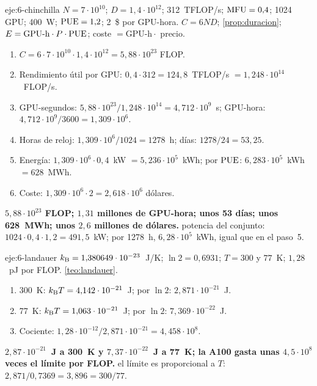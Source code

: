 \begin{solucion}{eje:6-chinchilla}
\datos $N=7\cdot 10^{10}$; $D=1{,}4\cdot 10^{12}$; 312~TFLOP/s; $\mathrm{MFU}=0{,}4$; 1024 GPU; 400~W; $\mathrm{PUE}=1{,}2$; 2~\$ por GPU-hora.
\planteamiento $C=6ND$; \cref{prop:duracion}; $E=\text{GPU-h}\cdot P\cdot\mathrm{PUE}$; coste $=\text{GPU-h}\cdot$ precio.
\pasos
\begin{enumerate}[label=\arabic*.]
  \item $C=6\cdot 7\cdot 10^{10}\cdot 1{,}4\cdot 10^{12}=5{,}88\cdot 10^{23}$ FLOP.
  \item Rendimiento útil por GPU: $0{,}4\cdot 312=124{,}8$~TFLOP/s $=1{,}248\cdot 10^{14}$~FLOP/s.
  \item GPU-segundos: $5{,}88\cdot 10^{23}/1{,}248\cdot 10^{14}=4{,}712\cdot 10^{9}$~s; GPU-hora: $4{,}712\cdot 10^{9}/3600=1{,}309\cdot 10^{6}$.
  \item Horas de reloj: $1{,}309\cdot 10^{6}/1024=1278$~h; días: $1278/24=53{,}25$.
  \item Energía: $1{,}309\cdot 10^{6}\cdot 0{,}4$~kW $=5{,}236\cdot 10^{5}$~kWh; por $\mathrm{PUE}$: $6{,}283\cdot 10^{5}$~kWh $=628$~MWh.
  \item Coste: $1{,}309\cdot 10^{6}\cdot 2=2{,}618\cdot 10^{6}$ dólares.
\end{enumerate}
\resultado \textbf{$5{,}88\cdot 10^{23}$ FLOP; $1{,}31$ millones de GPU-hora; unos 53 días; unos 628~MWh; unos $2{,}6$ millones de dólares.}
\comprobacion potencia del conjunto: $1024\cdot 0{,}4\cdot 1{,}2=491{,}5$~kW; por 1278~h, $6{,}28\cdot 10^{5}$~kWh, igual que en el paso~5.
\end{solucion}

\begin{solucion}{eje:6-landauer}
\datos $k_{\mathrm{B}}=1{,}380649\cdot 10^{-23}$~J/K; $\ln 2=0{,}6931$; $T=300$ y $77$~K; $1{,}28$~pJ por FLOP.
\planteamiento \cref{teo:landauer}.
\pasos
\begin{enumerate}[label=\arabic*.]
  \item 300~K: $k_{\mathrm{B}} T=4{,}142\cdot 10^{-21}$~J; por $\ln 2$: $2{,}871\cdot 10^{-21}$~J.
  \item 77~K: $k_{\mathrm{B}} T=1{,}063\cdot 10^{-21}$~J; por $\ln 2$: $7{,}369\cdot 10^{-22}$~J.
  \item Cociente: $1{,}28\cdot 10^{-12}/2{,}871\cdot 10^{-21}=4{,}458\cdot 10^{8}$.
\end{enumerate}
\resultado \textbf{$2{,}87\cdot 10^{-21}$~J a 300~K y $7{,}37\cdot 10^{-22}$~J a 77~K; la A100 gasta unas $4{,}5\cdot 10^{8}$ veces el límite por FLOP.}
\comprobacion el límite es proporcional a $T$: $2{,}871/0{,}7369=3{,}896=300/77$.
\end{solucion}

